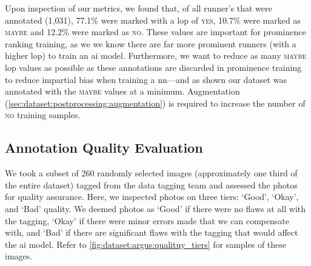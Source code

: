 Upon inspection of our  metrics, we found that, of all runner's that were annotated (1,031), 77.1\% were marked with a \gls{lop} of \textsc{yes}, 10.7\% were marked as \textsc{maybe} and 12.2\% were marked as \textsc{no}. These values are important for prominence ranking training, as we we know there are far more prominent runners (with a higher \gls{lop}) to train an \gls{ai} model. Furthermore, we want to reduce as many \textsc{maybe} \gls{lop} values as possible as these annotations are discarded in prominence training to reduce impartial bias when training a \gls{nn}---and as shown our dataset was annotated with the \textsc{maybe} values at a minimum. Augmentation (\cref{sec:dataset:postprocessing:augmentation}) is required to increase the number of \textsc{no} training samples.

\subsection{Annotation Quality Evaluation}
\label{sec:dataset:argus:quality_eval}

We took a subset of 260 randomly selected images  (approximately one third of the entire dataset) tagged from the data tagging team and assessed the photos for quality assurance. Here, we inspected photos on three tiers: `Good', `Okay', and `Bad' quality. We deemed photos as `Good' if there were no flaws at all with the tagging, `Okay' if there were minor errors made that we can compensate with, and `Bad' if there are significant flaws with the tagging that would affect the \gls{ai} model. Refer to \cref{fig:dataset:argus:qualituy_tiers} for samples of these images.

